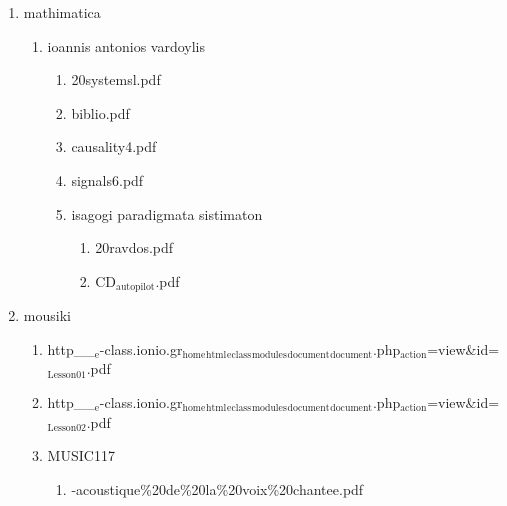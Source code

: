 \documentclass[11pt]{article}
\begin{document}
\begin{enumerate}
\begin{enumerate}
\begin{enumerate}
\item mathimatica
\label{sec-1-1-1-1-49-2-2-1-64-3}
\begin{enumerate}
\item ioannis antonios vardoylis
\label{sec-1-1-1-1-49-2-2-1-64-3-1}
\begin{enumerate}
\item 20systemsl.pdf
\label{sec-1-1-1-1-49-2-2-1-64-3-1-1}

\item biblio.pdf
\label{sec-1-1-1-1-49-2-2-1-64-3-1-2}

\item causality4.pdf
\label{sec-1-1-1-1-49-2-2-1-64-3-1-3}

\item signals6.pdf
\label{sec-1-1-1-1-49-2-2-1-64-3-1-4}

\item isagogi paradigmata sistimaton
\label{sec-1-1-1-1-49-2-2-1-64-3-1-5}
\begin{enumerate}
\item 20ravdos.pdf
\label{sec-1-1-1-1-49-2-2-1-64-3-1-5-1}

\item CD$_{\text{autopilot}}$.pdf
\label{sec-1-1-1-1-49-2-2-1-64-3-1-5-2}
\end{enumerate}
\end{enumerate}
\end{enumerate}

\item mousiki
\label{sec-1-1-1-1-49-2-2-1-64-4}
\begin{enumerate}
\item http\_\_$_{\text{e}}$-class.ionio.gr$_{\text{home}}$$_{\text{html}}$$_{\text{eclass}}$$_{\text{modules}}$$_{\text{document}}$$_{\text{document}}$.php$_{\text{action}}$=view\&id=$_{\text{Lesson01}}$.pdf
\label{sec-1-1-1-1-49-2-2-1-64-4-1}

\item http\_\_$_{\text{e}}$-class.ionio.gr$_{\text{home}}$$_{\text{html}}$$_{\text{eclass}}$$_{\text{modules}}$$_{\text{document}}$$_{\text{document}}$.php$_{\text{action}}$=view\&id=$_{\text{Lesson02}}$.pdf
\label{sec-1-1-1-1-49-2-2-1-64-4-2}

\item MUSIC117
\label{sec-1-1-1-1-49-2-2-1-64-4-3}
\begin{enumerate}
\item -acoustique\%20de\%20la\%20voix\%20chantee.pdf
\label{sec-1-1-1-1-49-2-2-1-64-4-3-1}


\end{enumerate}
\end{enumerate}
\end{enumerate}
\end{enumerate}
\end{enumerate}
\end{document}
